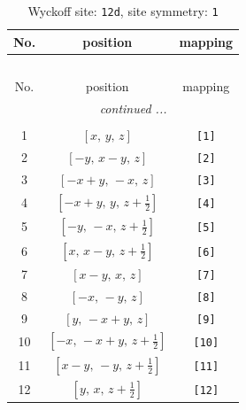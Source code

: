\documentclass[fleqn,8pt]{jsarticle}
\begin{document}
\begin{longtable}{ccc}
\caption{Wyckoff site: {\tt 12d}, site symmetry: {\tt 1}}
 \\
 \hline \hline
No. & position & mapping \\ \hline \endfirsthead

\multicolumn{2}{l}{\tablename\ \thetable{}} \\
 \hline \hline
No. & position & mapping \\ \hline \endhead

 \hline \hline
\multicolumn{2}{r}{\footnotesize\it continued ...} \\ \endfoot

 \hline \hline
\multicolumn{2}{r}{} \\ \endlastfoot

1 & $\left[ x,\, y,\, z \right]$ & {\tt [1]} \\ \hline
2 & $\left[ - y,\, x - y,\, z \right]$ & {\tt [2]} \\ \hline
3 & $\left[ - x + y,\, - x,\, z \right]$ & {\tt [3]} \\ \hline
4 & $\left[ - x + y,\, y,\, z + \frac{1}{2} \right]$ & {\tt [4]} \\ \hline
5 & $\left[ - y,\, - x,\, z + \frac{1}{2} \right]$ & {\tt [5]} \\ \hline
6 & $\left[ x,\, x - y,\, z + \frac{1}{2} \right]$ & {\tt [6]} \\ \hline
7 & $\left[ x - y,\, x,\, z \right]$ & {\tt [7]} \\ \hline
8 & $\left[ - x,\, - y,\, z \right]$ & {\tt [8]} \\ \hline
9 & $\left[ y,\, - x + y,\, z \right]$ & {\tt [9]} \\ \hline
10 & $\left[ - x,\, - x + y,\, z + \frac{1}{2} \right]$ & {\tt [10]} \\ \hline
11 & $\left[ x - y,\, - y,\, z + \frac{1}{2} \right]$ & {\tt [11]} \\ \hline
12 & $\left[ y,\, x,\, z + \frac{1}{2} \right]$ & {\tt [12]} \\
\end{longtable}
\end{document}
